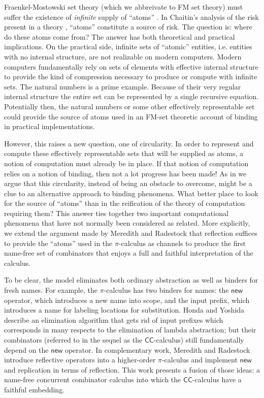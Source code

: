 \documentclass[submission,copyright,creativecommons]{eptcs}
\newcommand{\new}{\mathsf{new}}
\newcommand{\pic}{$\pi$-calculus}
\newcommand{\ccomb}{$\mathsf{CC}$-calculus}
\theoremstyle{definition}
\theoremstyle{remark}
\theoremstyle{remark}
\begin{document}
Fraenkel-Mostowski set theory (which we abbreivate to FM set theory)
must suffer the existence of \emph{infinite} supply of ``atoms''
\cite{DBLP:journals/fac/GabbayP02}. In Chaitin's analysis of the risk
present in a theory \cite{chaitin1999unknowable}, ``atoms'' constitute
a source of risk. The question is: where do these atoms come from?
The answer has both theoretical and practical implications. On the
practical side, infinite sets of ``atomic'' entities, i.e. entities
with no internal structure, are not realizable on modern
computers. Modern computers fundamentally rely on sets of elements
with effective internal structure to provide the kind of compression
necessary to produce or compute with infinite sets. The natural
numbers is a prime example. Because of their very regular internal
structure the entire set can be represented by a single recursive
equation. Potentially then, the natural numbers or some other
effectively representable set could provide the source of atoms used
in an FM-set theoretic account of binding in practical
implementations.

However, this raises a new question, one of circularity. In order to
represent and compute these effectively representable sets that will
be supplied as atoms, a notion of computation must already be in
place. If that notion of computation relies on a notion of binding,
then not a lot progress has been made! As in
\cite{DBLP:journals/entcs/MeredithR05} we argue that this circularity,
instead of being an obstacle to overcome, might be a clue to an
alternative approach to binding phenomena. What better place to
look for the source of ``atoms'' than in the reification of the theory
of computation requiring them? This answer ties together
two important computational phenomena that have not normally been
considered as related. More explicitly, we extend the argument made by
Meredith and Radestock that reflection suffices to provide the
``atoms'' used in the {\pic} as channels to produce the first
name-free set of combinators that enjoys a full and faithful
interpretation of the calculus.

To be clear, the model eliminates both ordinary abstraction as well as
binders for fresh names. For example, the {\pic}
\cite{milner91polyadicpi} has two binders for names: the $\new$
operator, which introduces a new name into scope, and the input
prefix, which introduces a name for labeling locations for
substitution.  Honda and Yoshida
\cite{DBLP:conf/popl/HondaY94,DBLP:journals/tcs/Yoshida02} describe an
elimination algorithm that gets rid of input prefixes which
corresponds in many respects to the elimination of lambda abstraction;
but their combinators (referred to in the sequel as the {\ccomb})
still fundamentally depend on the $\new$ operator.  In complementary
work, Meredith and Radestock \cite{DBLP:journals/entcs/MeredithR05}
introduce reflective operators into a higher-order {\pic} and
implement $\new$ and replication in terms of reflection.  This work
presents a fusion of those ideas: a name-free concurrent combinator
calculus into which the {\ccomb} have a faithful embedding.
\end{document}
